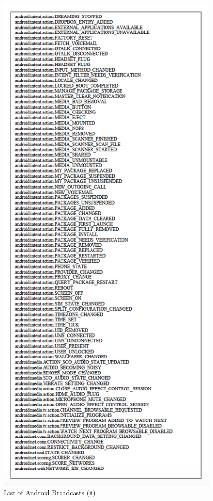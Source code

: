 \documentclass[12pt,twoside]{report}
\begin{document}
\begin{figure}
    \centering
    \includegraphics{figures/Broadcast2.png}
    \caption{List of Android Broadcasts (ii)}
    \label{fig:my_label}
\end{figure} 
\end{document}
